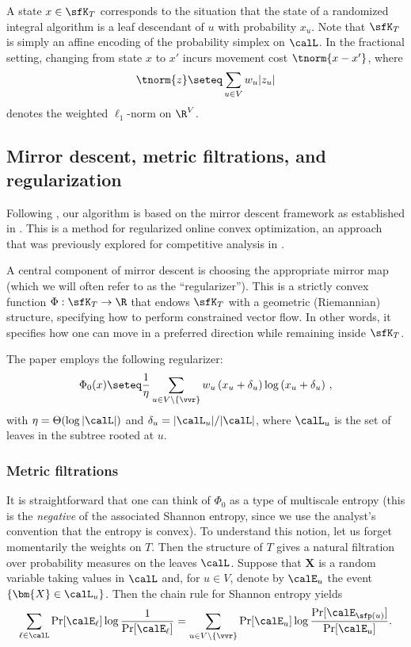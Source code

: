 A state $x\in\sfK_T$ corresponds to the situation that the state of a randomized integral algorithm is a leaf descendant of $u$ with probability $x_u$. Note that $\sfK_T$ is simply an affine encoding of the probability simplex on $\calL$. In the fractional setting, changing from state $x$ to $x'$ incurs movement cost $\tnorm{x-x'}$, where
\[
\tnorm{z} \seteq \sum_{u \in V} w_u |z_u|
\]
denotes the weighted $\ell_1$-norm on $\R^{V}$.

\subsection{Mirror descent, metric filtrations, and regularization}

Following \cite{BCLL19}, our algorithm is based on the mirror descent framework as established in \cite{BCLLM18}.
This is a method for regularized online convex optimization,
an approach that was previously explored for competitive analysis in \cite{ABBS10,BCN14}.

A central component of mirror descent is choosing the appropriate mirror map
(which we will often refer to as the ``regularizer'').  This is a strictly convex function
$\Phi : \sfK_T \to \R$ that endows $\sfK_T$ with a geometric (Riemannian) structure,
specifying how to perform constrained vector flow.  In other words,
it specifies how one can move in a preferred direction while remaining inside $\sfK_T$.

The paper \cite{BCLL19} employs the following regularizer:
\begin{equation}\label{eq:reg0}
\Phi_0(x) \seteq \frac{1}{\eta} \sum_{u \in V \setminus \{\vvr\}} w_u \left(x_u+\delta_u\right) \log \left(x_u+\delta_u\right)\,,
\end{equation}
with $\eta =\Theta(\log |\calL|)$ and $\delta_u = |\calL_u|/|\calL|$, where $\calL_u$ is the set of leaves in the subtree rooted at $u$.

\subsubsection{Metric filtrations}
It is straightforward that one can think of $\Phi_0$ as a type of multiscale entropy (this is the
\emph{negative} of the associated Shannon entropy, since we use the analyst's convention
that the entropy is convex).
To understand this notion, let us forget momentarily the weights on $T$.  Then
the structure of $T$ gives a natural filtration over probability measures on the leaves $\calL$.
Suppose that $\bm{X}$ is a random variable taking values in $\calL$ and,
for $u \in V$, denote by $\calE_u$ the event $\{\bm{X} \in \calL_u\}$.
Then the chain rule for Shannon entropy yields
\[
\sum_{\ell\in\calL} \Pr[\calE_\ell]\log \frac{1}{\Pr[\calE_{\ell}]} = 
\sum_{u\in V\setminus\{\vvr\}}
\Pr[\calE_u] \log \frac{\Pr[\calE_{\sfp(u)}]}{\Pr[\calE_u]}.
\]

